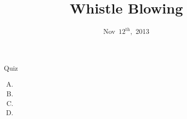 \documentclass{beamer}
\title{Whistle Blowing}
\date{Nov~$12^{\text{th}}$,~2013}
\begin{document}
\begin{frame}
\titlepage
\end{frame}

\begin{frame}{Quiz}
\begin{enumerate}[(A)]
\item<1>
\item<1>
\item<1-2>
\item<1>
\end{enumerate}
\end{frame}
\end{document}
